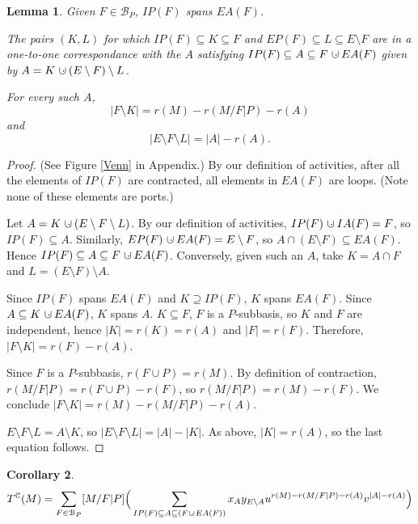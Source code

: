 \documentclass[12pt,leqno]{amsart}
\newtheorem{lem}{Lemma}
\newtheorem{cor}[lem]{Corollary}
\theoremstyle{remark}
\newcommand{\dunion}
{\mbox{\hbox{\hskip6pt$\cdot$\hskip-5.50pt$\cup$\hskip2pt}}}
\newcommand{\dunionsubscript}
{\mbox{\scriptsize\hbox{\hskip4pt$\cdot$\hskip-4.35pt$\cup$\hskip2pt}}}
\newcommand{\Card}[1]{\ensuremath{{\left|#1\right|}}}
\begin{document}
\begin{lem}
\label{KLAlemma}
Given $F\in\mathcal{B}_P$,
$IP(F)$ spans $EA(F)$.

The pairs $(K,L)$ for which 
       $IP(F)\subseteq K \subseteq F$ and 
       $EP(F)\subseteq L \subseteq E\setminus F$
are in a one-to-one correspondance
with the $A$ satisfying $IP(F)\subseteq A\subseteq F\dunion EA(F)$
given by $A=K\dunion (E\setminus F)\setminus L$.


For every such $A$, 
\[
\Card{F\setminus K}=r(M)-r(M/F|P)-r(A)
\]
and
\[
\Card{E\setminus F\setminus L} = \Card{A}-r(A).
\]
\end{lem}

\begin{proof}
(See Figure \ref{Venn} in Appendix.) By our definition of activities,
after all the elements of $IP(F)$ are contracted, all elements 
in $EA(F)$ are loops.
(Note none of these elements are ports.)

Let 
$A=K\dunion (E\setminus F\setminus L)$.
By our definition of activities,
$IP(F)\dunion IA(F)=F$, so $IP(F)\subseteq A$.
Similarly,  
$EP(F)\dunion EA(F)=E\setminus F$, so 
$A\cap(E\setminus F)\subseteq EA(F)$.
Hence 
$IP(F)\subseteq A\subseteq F\dunion EA(F)$.
Conversely, given such an $A$, 
take $K=A\cap F$ and $L=(E\setminus F)\setminus A$.

Since $IP(F)$ spans $EA(F)$ and $K\supseteq IP(F)$, $K$ spans $EA(F)$.
Since $A\subseteq K\dunion EA(F)$, $K$ spans $A$.
$K\subseteq F$, $F$ is a $P$-subbasis, so $K$ and $F$ are independent,
hence $\Card{K}=r(K)=r(A)$ and $\Card{F}=r(F)$.  
Therefore, $\Card{F\setminus K}=r(F)-r(A)$.

Since $F$ is a $P$-subbasis, $r(F\cup P)=r(M)$.
By definition of contraction, $r(M/F|P)=r(F\cup P) - r(F)$,
so $r(M/F|P)=r(M)-r(F)$.  We conclude 
$\Card{F\setminus K}=r(M)-r(M/F|P)-r(A)$.

$E\setminus F\setminus L = A\setminus K$, so
$\Card{E\setminus F\setminus L} = \Card{A}-\Card{K}$.
As above, $\Card{K}=r(A)$, so the last equation follows.
\end{proof}


\begin{cor}
\begin{equation}
\label{FIntervalExpansion}
T^{\mathcal{C}}(M)=
\sum_{F\in \mathcal{B}_P}[M/F|P]
\Big(
\sum_{IP(F)\subseteq A \subseteq (F\!\dunionsubscript\! EA(F))}
 x_{A}
 y_{E\setminus A}
 u^{r(M)-r(M/F|P)-r(A)}
 v^{\Card{A}-r(A)}
\Big)
\end{equation}
\end{cor}
\end{document}
